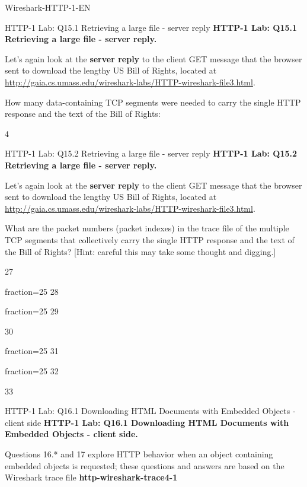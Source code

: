\documentclass[a4paper]{article}
\begin{document}
\begin{quiz}{Wireshark-HTTP-1-EN}
\begin{shortanswer}[points=1]{HTTP-1 Lab: Q15.1 Retrieving a large file - server reply}
\textbf{HTTP-1 Lab: Q15.1 Retrieving a large file - server reply.} 

Let's again look at the \textbf{server reply} to the client GET message that the browser sent to download the lengthy US Bill of Rights, located at  \href{http://gaia.cs.umass.edu/wireshark-labs/HTTP-wireshark-file3.html}{http://gaia.cs.umass.edu/wireshark-labs/HTTP-wireshark-file3.html}.

How many data-containing TCP segments were needed to carry the single HTTP response and the text of the Bill of Rights: 
\item 4
\end{shortanswer}

\begin{multi}[points=1,multiple]{HTTP-1 Lab: Q15.2 Retrieving a large file - server reply}
\textbf{HTTP-1 Lab: Q15.2 Retrieving a large file - server reply.} 

Let's again look at the \textbf{server reply} to the client GET message that the browser sent to download the lengthy US Bill of Rights, located at \href{http://gaia.cs.umass.edu/wireshark-labs/HTTP-wireshark-file3.html}{http://gaia.cs.umass.edu/wireshark-labs/HTTP-wireshark-file3.html}. 

What are the packet numbers (packet indexes) in the trace file of the multiple TCP segments that collectively carry the single HTTP response and the text of the Bill of Rights? [Hint: careful this may take some thought and digging.] 
\item 27
\item[fraction=25] 28
\item[fraction=25] 29
\item 30
\item[fraction=25] 31
\item[fraction=25] 32
\item 33
\end{multi}

\begin{shortanswer}[points=1]{HTTP-1 Lab: Q16.1 Downloading HTML Documents with Embedded Objects - client side}
\textbf{HTTP-1 Lab: Q16.1 Downloading HTML Documents with Embedded Objects - client side.}

Questions 16.* and 17 explore HTTP behavior when an object containing embedded objects is requested; these questions and answers are based on the Wireshark trace file \textbf{http-wireshark-trace4-1}


\end{shortanswer}
\end{quiz}
\end{document}
